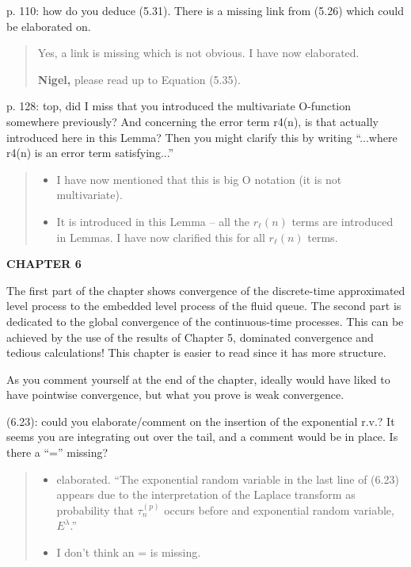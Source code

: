 \documentclass[a4paper]{article}
\begin{document}
p. 110: how do you deduce (5.31). There is a missing link from (5.26) which could be elaborated on.
\begin{quote}
    Yes, a link is missing which is not obvious. I have now elaborated.

    \textbf{Nigel,} please read up to Equation (5.35). 
\end{quote}

p. 128: top, did I miss that you introduced the multivariate O-function somewhere previously? And concerning the error term r4(n), is that actually introduced here in this Lemma? Then you might clarify this by writing “...where r4(n) is an error term satisfying...”
\begin{quote}
    \begin{itemize}
        \item I have now mentioned that this is big O notation (it is not multivariate). 
        \item It is introduced in this Lemma -- all the \(r_\ell(n)\) terms are introduced in Lemmas. I have now clarified this for all \(r_\ell(n)\) terms.
    \end{itemize}
\end{quote}

\noindent\textbf{CHAPTER 6}

The first part of the chapter shows convergence of the discrete-time approximated level process to the embedded level process of the fluid queue. The second part is dedicated to the global convergence of the continuous-time processes. This can be achieved by the use of the results of Chapter 5, dominated convergence and tedious calculations! This chapter is easier to read since it has more structure.

As you comment yourself at the end of the chapter, ideally would have liked to have pointwise convergence, but what you prove is weak convergence.

(6.23): could you elaborate/comment on the insertion of the exponential r.v.? It seems you are integrating out over the tail, and a comment would be in place. Is there a “=” missing?
\begin{quote}
    \begin{itemize}
        \item elaborated. ``The exponential random variable in the last line of (6.23) appears due to the interpretation of the Laplace transform as probability that \(\tau_n^{(p)}\) occurs before and exponential random variable, \(E^\lambda\).''
        \item I don't think an = is missing.
    \end{itemize}
\end{quote}
\end{document}
